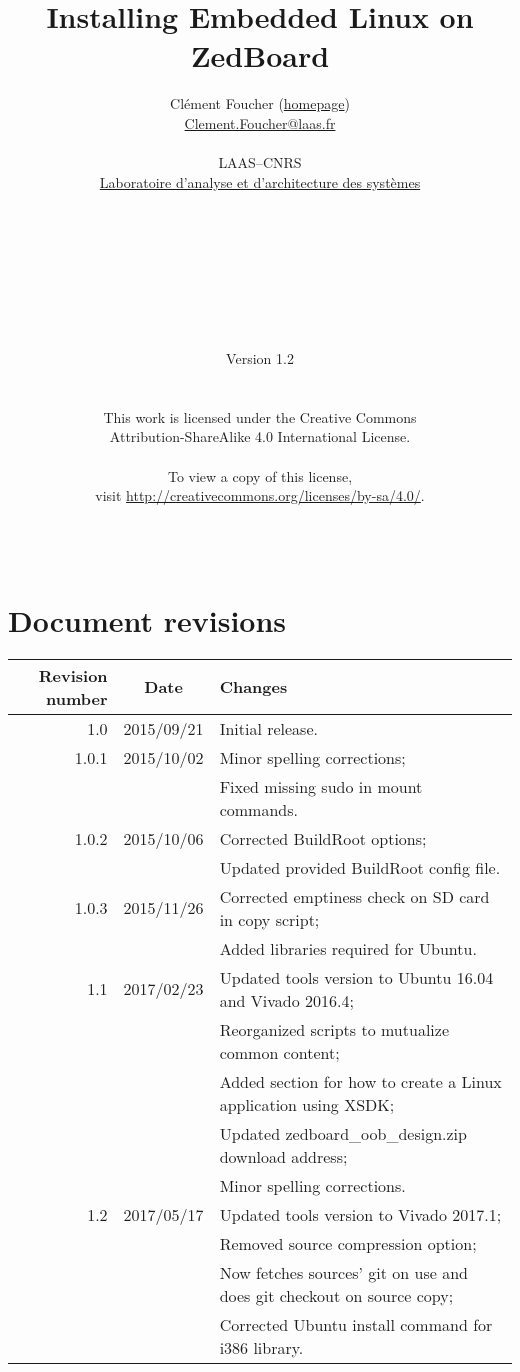 \documentclass[openany,a4paper]{book}
\title{Installing Embedded Linux on ZedBoard}
\author
{
        Clément Foucher (\href{https://homepages.laas.fr/cfoucher}{homepage})\\
	\href{mailto:Clement.Foucher@laas.fr}{Clement.Foucher@laas.fr}\\
	\\
	LAAS--CNRS\\
	\href{https://www.laas.fr/public/en}{Laboratoire d'analyse et d'architecture des syst\`emes}\\
	\\
	\\
	\\
        \\
        \\
	\\
	\\
	\\
	Version 1.2\\
	\\
	\\
	This work is licensed under the Creative Commons\\
	Attribution-ShareAlike 4.0 International License.\\
	\\
	To view a copy of this license,\\
	visit \href{http://creativecommons.org/licenses/by-sa/4.0/}{http://creativecommons.org/licenses/by-sa/4.0/}.
	\\
	\\
	\\
}
\begin{document}
\maketitle

\tableofcontents


\newpage

\chapter*{Document revisions}

\begin{center}

\begin{tabular}{ r | c || l }
   Revision number & Date       & Changes \\ \hline \hline
   1.0             & 2015/09/21 & Initial release. \\ \hline
   1.0.1           & 2015/10/02 & Minor spelling corrections; \\
                   &            & Fixed missing sudo in mount commands. \\ \hline
   1.0.2           & 2015/10/06 & Corrected BuildRoot options; \\
                   &            & Updated provided BuildRoot config file.\\ \hline
   1.0.3           & 2015/11/26 & Corrected emptiness check on SD card in copy script; \\
                   &            & Added libraries required for Ubuntu.\\ \hline
   1.1             & 2017/02/23 & Updated tools version to Ubuntu 16.04 and Vivado 2016.4;\\
                   &            & Reorganized scripts to mutualize common content;\\
                   &            & Added section for how to create a Linux application using XSDK;\\
                   &            & Updated zedboard\_oob\_design.zip download address;\\
                   &            & Minor spelling corrections.\\ \hline
   1.2             & 2017/05/17 & Updated tools version to Vivado 2017.1;\\
                   &            & Removed source compression option;\\
                   &            & Now fetches sources' git on use and does git checkout on source copy;\\
                   &            & Corrected Ubuntu install command for i386 library.
\end{tabular}


\end{center}
\end{document}
